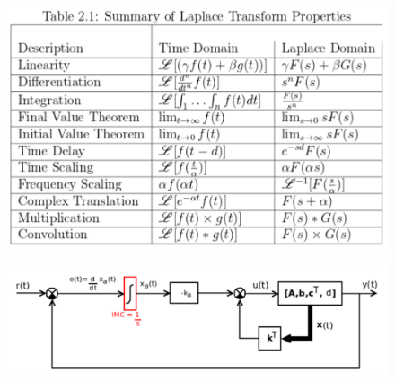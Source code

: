 \documentclass[a4paper, 10pt, titlepage]{article}
\begin{document}
%
%
%
%

\newpage
\begin{paracol}{2}[]
\medskip \medskip
\begin{figure}
\begin{center}
\includegraphics[scale=0.5]{laplace-properties.pdf}
\end{center}
\end{figure}

\begin{figure}
\begin{center}
\includegraphics[scale=0.3]{setpoint-statef.pdf}
\end{center}
\end{figure}


\end{paracol}
\end{document}
